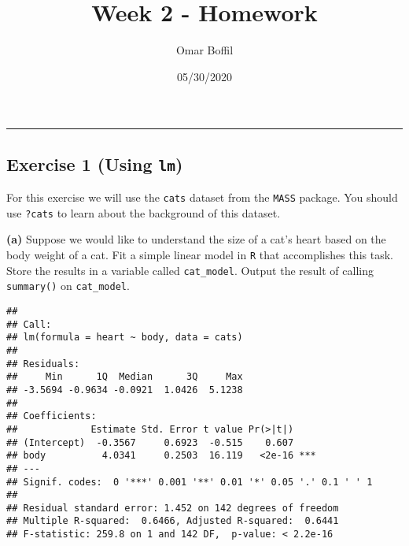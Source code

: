 \documentclass[]{article}
\title{Week 2 - Homework}
\author{Omar Boffil}
\date{05/30/2020}
\newenvironment{Shaded}{\begin{snugshade}}{\end{snugshade}}
\newcommand{\DataTypeTok}[1]{\textcolor[rgb]{0.13,0.29,0.53}{#1}}
\newcommand{\KeywordTok}[1]{\textcolor[rgb]{0.13,0.29,0.53}{\textbf{#1}}}
\newcommand{\NormalTok}[1]{#1}
\newcommand{\OperatorTok}[1]{\textcolor[rgb]{0.81,0.36,0.00}{\textbf{#1}}}
\newcommand{\StringTok}[1]{\textcolor[rgb]{0.31,0.60,0.02}{#1}}
\begin{document}
\maketitle

\begin{center}\rule{0.5\linewidth}{0.5pt}\end{center}

\hypertarget{exercise-1-using-lm}{%
\subsection{\texorpdfstring{Exercise 1 (Using
\texttt{lm})}{Exercise 1 (Using lm)}}\label{exercise-1-using-lm}}

For this exercise we will use the \texttt{cats} dataset from the
\texttt{MASS} package. You should use \texttt{?cats} to learn about the
background of this dataset.

\textbf{(a)} Suppose we would like to understand the size of a cat's
heart based on the body weight of a cat. Fit a simple linear model in
\texttt{R} that accomplishes this task. Store the results in a variable
called \texttt{cat\_model}. Output the result of calling
\texttt{summary()} on \texttt{cat\_model}.

\begin{Shaded}
\end{Shaded}

\begin{verbatim}
## 
## Call:
## lm(formula = heart ~ body, data = cats)
## 
## Residuals:
##     Min      1Q  Median      3Q     Max 
## -3.5694 -0.9634 -0.0921  1.0426  5.1238 
## 
## Coefficients:
##             Estimate Std. Error t value Pr(>|t|)    
## (Intercept)  -0.3567     0.6923  -0.515    0.607    
## body          4.0341     0.2503  16.119   <2e-16 ***
## ---
## Signif. codes:  0 '***' 0.001 '**' 0.01 '*' 0.05 '.' 0.1 ' ' 1
## 
## Residual standard error: 1.452 on 142 degrees of freedom
## Multiple R-squared:  0.6466, Adjusted R-squared:  0.6441 
## F-statistic: 259.8 on 1 and 142 DF,  p-value: < 2.2e-16
\end{verbatim}
\end{document}
